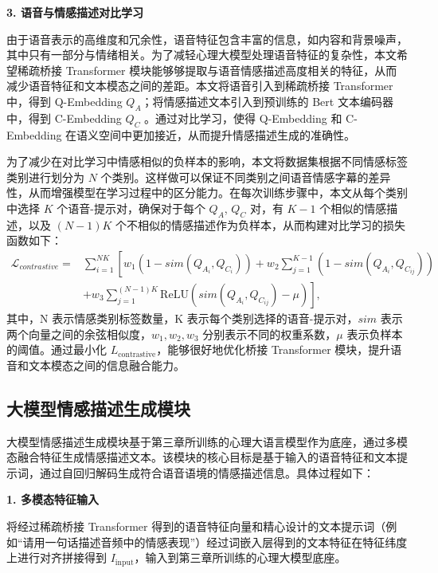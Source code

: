 \textbf{3. 语音与情感描述对比学习}

由于语音表示的高维度和冗余性，语音特征包含丰富的信息，如内容和背景噪声，其中只有一部分与情绪相关。为了减轻心理大模型处理语音特征的复杂性，本文希望稀疏桥接 Transformer 模块能够够提取与语音情感描述高度相关的特征，从而减少语音特征和文本模态之间的差距。本文将语音引入到稀疏桥接 Transformer 中，得到 Q-Embedding $Q_A$；将情感描述文本引入到预训练的 Bert 文本编码器中，得到 C-Embedding $Q_C$ 。通过对比学习，使得 Q-Embedding 和 C-Embedding 在语义空间中更加接近，从而提升情感描述生成的准确性。

为了减少在对比学习中情感相似的负样本的影响，本文将数据集根据不同情感标签类别进行划分为 $N$ 个类别。这样做可以保证不同类别之间语音情感字幕的差异性，从而增强模型在学习过程中的区分能力。在每次训练步骤中，本文从每个类别中选择 $K$ 个语音-提示对，确保对于每个 $Q_A$, $Q_C$ 对，有 $K - 1$ 个相似的情感描述，以及 $(N - 1)K$ 个不相似的情感描述作为负样本，从而构建对比学习的损失函数如下：
\begin{equation}
\begin{aligned}
  \mathcal{L}_{contrastive} = & \sum_{i=1}^{NK} \left[ w_1(1 - sim(Q_{A_i}, Q_{C_i})) + w_2 \sum_{j=1}^{K-1} (1 - sim(Q_{A_i}, Q_{C_{ij}})) \right. \\
  & \left. + w_3 \sum_{j=1}^{(N-1)K} \text{ReLU}(sim(Q_{A_i}, Q_{C_{ij}}) - \mu) \right],
\end{aligned}
\end{equation}
其中，N 表示情感类别标签数量，K 表示每个类别选择的语音-提示对，$sim$ 表示两个向量之间的余弦相似度，$w_1, w_2, w_3$ 分别表示不同的权重系数，$\mu$ 表示负样本的阈值。通过最小化 $L_{\text{contrastive}}$，能够很好地优化桥接 Transformer 模块，提升语音和文本模态之间的信息融合能力。

\subsection{大模型情感描述生成模块}

大模型情感描述生成模块基于第三章所训练的心理大语言模型作为底座，通过多模态融合特征生成情感描述文本。该模块的核心目标是基于输入的语音特征和文本提示词，通过自回归解码生成符合语音语境的情感描述信息。具体过程如下：

\textbf{1. 多模态特征输入}

将经过稀疏桥接 Transformer 得到的语音特征向量和精心设计的文本提示词（例如“请用一句话描述音频中的情感表现”）经过词嵌入层得到的文本特征在特征纬度上进行对齐拼接得到 $I_{\text{input}}$，输入到第三章所训练的心理大模型底座。

